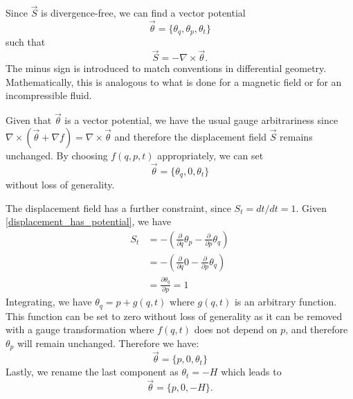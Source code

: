 \documentclass[10pt,twocolumn, nofootinbib]{revtex4-2}
\begin{document}
Since $\vec{S}$ is divergence-free, we can find a vector potential
\begin{equation}
	\vec{\theta} = \{\theta_q, \theta_p, \theta_t\}
\end{equation}
such that
\begin{equation}\label{displacement_has_potential}
	\vec{S} = - \nabla \times \vec{\theta}.
\end{equation}
The minus sign is introduced to match conventions in differential geometry. Mathematically, this is analogous to what is done for a magnetic field or for an incompressible fluid.

Given that $\vec{\theta}$ is a vector potential, we have the usual gauge arbitrariness since $\nabla \times(\vec{\theta} + \nabla f) = \nabla \times \vec{\theta}$ and therefore the displacement field $\vec{S}$ remains unchanged. By choosing $f(q,p,t)$ appropriately, we can set
\begin{equation}
	\vec{\theta} = \{\theta_q, 0, \theta_t\}
\end{equation}
without loss of generality.

The displacement field has a further constraint, since $S_t = dt/ dt = 1$. Given \ref{displacement_has_potential}, we have
\begin{align*}
	S_t &= - \left(\frac{\partial}{\partial q}  \theta_p - \frac{\partial}{\partial p}  \theta_q\right) \\
	&= - \left(\frac{\partial}{\partial q}  0 - \frac{\partial}{\partial p}  \theta_q\right) \\
	& = \frac{\partial \theta_q}{\partial p} = 1
\end{align*}
Integrating, we have $\theta_q = p + g(q,t)$ where $g(q,t)$ is an arbitrary function. This function can be set to zero without loss of generality as it can be removed with a gauge transformation where $f(q,t)$ does not depend on $p$, and therefore $\theta_p$ will remain unchanged. Therefore we have:
\begin{equation}
	\vec{\theta} = \{p, 0, \theta_t\}
\end{equation}
Lastly, we rename the last component as $\theta_t = -H$ which leads to 
\begin{equation}\label{potential_final}
	\vec{\theta} = \{p, 0, -H\}.
\end{equation}
\end{document}
